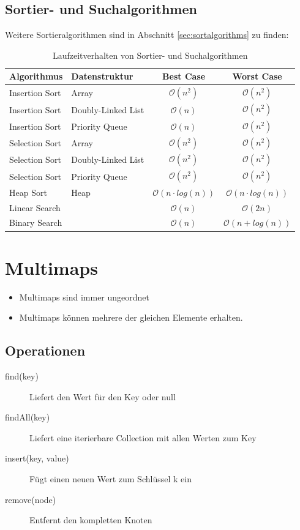 \subsection{Sortier- und Suchalgorithmen}
Weitere Sortieralgorithmen sind in Abschnitt \ref{sec:sortalgorithms} zu finden:
\begin{table}[h!]
	\centering
	\begin{tabu} to \linewidth {l l c c}
		\toprule
		Algorithmus & Datenstruktur & Best Case  & Worst Case\\
		\midrule
		Insertion Sort & Array & $\mathcal{O}(n^2)$ & $\mathcal{O}(n^2)$  \\
		Insertion Sort & Doubly-Linked List & $\mathcal{O}(n)$ & $\mathcal{O}(n^2)$  \\
		Insertion Sort & Priority Queue & $\mathcal{O}(n)$ & $\mathcal{O}(n^2)$  \\
		Selection Sort & Array & $\mathcal{O}(n^2)$ & $\mathcal{O}(n^2)$ \\
		Selection Sort & Doubly-Linked List & $\mathcal{O}(n^2)$ & $\mathcal{O}(n^2)$ \\
		Selection Sort & Priority Queue & $\mathcal{O}(n^2)$ & $\mathcal{O}(n^2)$ \\
		Heap Sort & Heap & $\mathcal{O}(n \cdot log(n))$ & $\mathcal{O}(n \cdot log(n))$ \\
		Linear Search & & $\mathcal{O}(n)$ & $\mathcal{O}(2n)$ \\
		Binary Search & & $\mathcal{O}(n)$ & $\mathcal{O}(n + log(n))$ \\
		\bottomrule
	\end{tabu}
	\caption{Laufzeitverhalten von Sortier- und Suchalgorithmen}
\end{table}


\section{Multimaps}
\begin{itemize}
	\item Multimaps sind immer ungeordnet
	\item Multimaps können mehrere der gleichen Elemente erhalten.
\end{itemize}

\subsection{Operationen}
\begin{description}
	\item[find(key)] Liefert den Wert für den Key oder null
	\item[findAll(key)] Liefert eine iterierbare Collection mit allen Werten zum Key
	\item[insert(key, value)] Fügt einen neuen Wert zum Schlüssel k ein
	\item[remove(node)] Entfernt den kompletten Knoten
\end{description}

